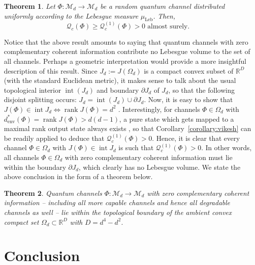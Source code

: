 \documentclass[a4paper,onecolumn,10pt,accepted=2022-07-11]{quantumarticle}
\newcommand{\M}[1]{\mathcal{M}_{#1}}
\newcommand{\env}{\operatorname{env}}
\newcommand{\leb}{\operatorname{Leb}}
\newtheorem{theorem}{Theorem}[section]
\theoremstyle{definition}
\begin{document}
\begin{theorem}\label{theorem:main2}
Let $\Phi:\M{d}\to \M{d}$ be a random quantum channel distributed uniformly according to the Lebesgue measure $\mu_{\leb}$. Then, 
\begin{equation*}
    \mathcal{Q}_c(\Phi)\geq\mathcal{Q}^{(1)}_c(\Phi)>0 \text{ almost surely}.
\end{equation*}
\end{theorem}

Notice that the above result amounts to saying that quantum channels with zero complementary coherent information contribute no Lebesgue volume to the set of all channels. Perhaps a geometric interpretation would provide a more insightful description of this result. Since $J_d:=J(\Omega_d)$ is a compact convex subset of $\mathbb{R}^D$ (with the standard Euclidean metric), it makes sense to talk about the usual topological interior $\operatorname{int} (J_d)$ and boundary $\partial J_d$ of $J_d$, so that the following disjoint splitting occurs: $J_d=\operatorname{int} (J_d)\cup \partial J_d$. Now, it is easy to show that $J(\Phi)\in \operatorname{int} J_d \iff \operatorname{rank}J(\Phi)=d^2$ \cite[Proposition 15]{Mario2014boundary}. Interestingly, for channels $\Phi\in\Omega_d$ with $d^*_{\env}(\Phi)=\operatorname{rank}J(\Phi)>d(d-1)$, a pure state which gets mapped to a maximal rank output state always exists \cite[Corollary II.10]{Singh2022detecting}, so that Corollary~\ref{corollary:vikesh} can be readily applied to deduce that $\mathcal{Q}^{(1)}_c(\Phi)>0$. Hence, it is clear that every channel $\Phi\in \Omega_d$ with $J(\Phi)\in\operatorname{int}J_d$ is such that $\mathcal{Q}^{(1)}_c(\Phi)>0$. In other words, all channels $\Phi\in\Omega_d$ with zero complementary coherent information must lie within the boundary $\partial J_d$, which clearly has no Lebesgue volume. We state the above conclusion in the form of a theorem below. 

\begin{theorem}\label{theorem:main3}
Quantum channels $\Phi:\M{d}\to\M{d}$ with zero complementary coherent information -- including all more capable channels and hence all degradable channels as well -- lie within the topological boundary of the ambient convex compact set $\Omega_d \subset \mathbb{R}^D$ with $D=d^4-d^2$.
\end{theorem}

\section{Conclusion}\label{sec:end}
\end{document}
